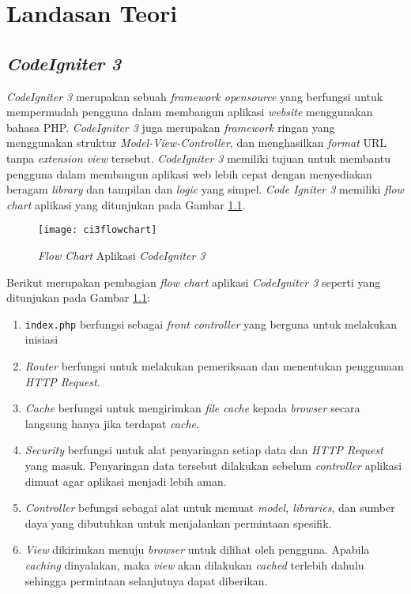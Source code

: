 \chapter{Landasan Teori}
\label{chap:teori}

\section{\textit{CodeIgniter 3} \cite{ci3:22}}
\label{sec:ci3} 
 
\textit{CodeIgniter 3} merupakan sebuah \textit{framework opensource} yang berfungsi untuk mempermudah pengguna dalam membangun aplikasi \textit{website} menggunakan bahasa PHP. \textit{CodeIgniter 3} juga merupakan \textit{framework} ringan yang menggunakan struktur \textit{Model-View-Controller}, dan menghasilkan \textit{format} URL tanpa \textit{extension view} tersebut. \textit{CodeIgniter 3} memiliki tujuan untuk membantu pengguna dalam membangun aplikasi web lebih cepat dengan menyediakan beragam \textit{library} dan tampilan dan \textit{logic} yang simpel. \textit{Code Igniter 3} memiliki \textit{flow chart} aplikasi yang ditunjukan pada Gambar \ref{fig:ci3flowchart}.

\begin{figure}[H]
	\centering  
	\texttt{[image: ci3flowchart]}  
	\caption[\textit{Flow Chart} Aplikasi \textit{CodeIgniter 3}]{\textit{Flow Chart} Aplikasi \textit{CodeIgniter 3}} 
	\label{fig:ci3flowchart} 
\end{figure} 

Berikut merupakan pembagian \textit{flow chart} aplikasi \textit{CodeIgniter 3} seperti yang ditunjukan pada Gambar \ref{fig:ci3flowchart}:
\begin{enumerate}
\item \texttt{index.php} berfungsi sebagai \textit{front controller} yang berguna untuk melakukan inisiasi
\item \textit{Router} berfungsi untuk melakukan pemeriksaan dan menentukan penggunaan \textit{HTTP Request}.
\item \textit{Cache} berfungsi untuk mengirimkan \textit{file cache} kepada \textit{browser} secara langsung hanya jika terdapat \textit{cache}.   
\item \textit{Security} berfungsi untuk alat penyaringan setiap data dan \textit{HTTP Request} yang masuk. Penyaringan data tersebut dilakukan sebelum \textit{controller} aplikasi dimuat agar aplikasi menjadi lebih aman.
\item \textit{Controller} befungsi sebagai alat untuk memuat \textit{model, libraries}, dan sumber daya yang dibutuhkan untuk menjalankan permintaan spesifik.
\item \textit{View} dikirimkan menuju \textit{browser} untuk dilihat oleh pengguna. Apabila \textit{caching} dinyalakan, maka \textit{view} akan dilakukan \textit{cached} terlebih dahulu sehingga permintaan selanjutnya dapat diberikan.
\end{enumerate}

